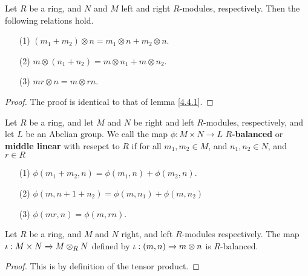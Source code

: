 \begin{lemma}\label{4.4.4}
    Let $R$ be a ring, and $N$ and $M$ left and right $R$-modules, respectively.
    Then the following relations hold.
    \begin{enumerate}
        \item[(1)] $(m_1+m_2) \otimes n=m_1 \otimes n+m_2 \otimes n$.

        \item[(2)] $m \otimes (n_1+n_2)=m \otimes n_1+m \otimes n_2$.

        \item[(3)] $mr \otimes n=m \otimes rn$.
    \end{enumerate}
\end{lemma}
\begin{proof}
    The proof is identical to that of lemma \ref{4.4.1}.
\end{proof}

\begin{definition}
    Let $R$ be a ring, and let $M$ and $N$ be right and left $R$-modules,
    respectively, and let $L$ be an Abelian group. We call the map $\phi:M
    \times N \xrightarrow{} L$ \textbf{$R$-balanced} or \textbf{middle linear}
    with resepct to $R$ if for all $m_1,m_2 \in M$, and $n_1,n_2 \in N$, and $r
    \in R$
    \begin{enumerate}
        \item[(1)] $\phi(m_1+m_2,n)=\phi(m_1,n)+\phi(m_2,n)$.

        \item[(2)] $\phi(m,n+1+n_2)=\phi(m,n_1)+\phi(m,n_2)$

        \item[(3)] $\phi(mr,n)=\phi(m,rn)$.
    \end{enumerate}
\end{definition}

\begin{lemma}\label{4.4.5}
    Let $R$ be a ring, and $M$ and $N$ right, and left $R$-modules respectively.
    The map $\iota:M \times N \xrightarrow{} M \otimes_R N$ defined by $\iota:(m,n)
    \xrightarrow{} m \otimes n$ is $R$-balanced.
\end{lemma}
\begin{proof}
    This is by definition of the tensor product.
\end{proof}

